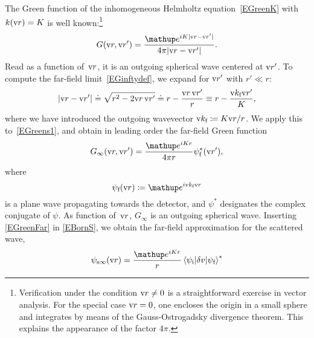 The Green function of the inhomogeneous Helmholtz equation~\cref{EGreenK}
with $k(\text{v}{r})=K$ is well known:\footnote
{Verification under the condition $\text{v}{r}\ne0$
is a straightforward exercise in vector analysis.
For the special case $\text{v}{r}=0$,
one encloses the origin in a small sphere
and integrates by means of the Gauss-Ostrogadsky divergence theorem.
This explains the appearance of the factor $4\pi$.}
%
\begin{equation}\label{EGreens1}
  G(\r,\r') = \frac{\e^{iK|\r-\r'|}}{4\pi |\r-\r'|}.
\end{equation}
Read as a function of~$\text{v}{r}$, it is an outgoing spherical wave centered at $\text{v}{r}'$.
To compute the far-field limit~\cref{EGinftydef},
we expand for $\text{v}{r}'$ with $r'\ll r$:
\begin{equation}
  \left|\text{v}{r}-\text{v}{r}'\right|
  \doteq \sqrt{r^2-2\text{v}{r}\,\text{v}{r}'}
  \doteq r - \frac{\text{v}{r}\,\text{v}{r}'}{r}
  \equiv r - \frac{\text{v}{k}_{\text{f}} \text{v}{r}'}{K},
\end{equation}
%
where we have introduced the outgoing wavevector
$  \text{v}{k}_{\text{f}}\coloneqq K \text{v}{r} / r$.
We apply this to~\cref{EGreens1},
%
and obtain in leading order the far-field Green function
\begin{equation}\label{EGreenFar}
  G_\infty(\r,\r')
  = \frac{\e^{iKr}}{4\pi r}\psi^*_\sf(\r'),
\end{equation}
%
where
\begin{equation}\label{EPsisfar}
  \psi_\sf(\r) \coloneqq  \e^{i\k_\sf \r}
\end{equation}
%
is a plane wave propagating towards the detector,
and $\psi^*$ designates the complex conjugate of $\psi$.
As function of~$\text{v}{r}$, $G_\infty$ is an outgoing spherical wave.
Inserting \cref{EGreenFar} in \cref{EBornS},
we obtain the far-field approximation for the scattered wave,
%
\begin{equation}\label{EsandwichC}
  \psi_{\text{s}\infty}(\r)
  = \frac{\e^{iKr}}{r}
    \bra \psi_\si|\delta v|\psi_\sf\ket^*
\end{equation}
%
